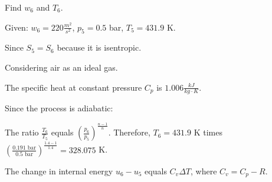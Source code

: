 Find \( w_6 \) and \( T_6 \).

Given:
\( w_6 = 220 \frac{m^2}{s^2} \), \( p_5 = 0.5 \) bar, \( T_5 = 431.9 \) K.

Since \( S_5 = S_6 \) because it is isentropic.

Considering air as an ideal gas.

The specific heat at constant pressure \( C_p \) is \( 1.006 \frac{kJ}{kg \cdot K} \).

Since the process is adiabatic:

The ratio \( \frac{T_6}{T_5} \) equals \( \left( \frac{p_6}{p_5} \right)^{\frac{n-1}{n}} \). Therefore, \( T_6 = 431.9 \) K times \( \left( \frac{0.191 \text{ bar}}{0.5 \text{ bar}} \right)^{\frac{1.4-1}{1.4}} = 328.075 \) K.

The change in internal energy \( u_6 - u_5 \) equals \( C_v \Delta T \), where \( C_v = C_p - R \).